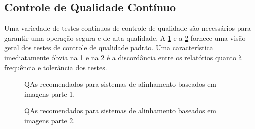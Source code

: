 \documentclass[11pt,a4paper]{article}
\begin{document}
\subsection*{Controle de Qualidade Contínuo}

    Uma variedade de testes contínuos de controle de qualidade são necessários para garantir uma operação segura e de alta qualidade. A \ref{fig:qaImagensParte1} e a \ref{fig:qaImagensParte2} fornece uma visão geral dos testes de controle de qualidade padrão. Uma característica imediatamente óbvia na \ref{fig:qaImagensParte1} e na \ref{fig:qaImagensParte2} é a discordância entre os relatórios quanto à frequência e tolerância dos testes.

    \begin{figure}[!h]
        \centering
        \caption{QAs recomendados para sistemas de alinhamento baseados em imagens parte 1.}
        \label{fig:qaImagensParte1}
    \end{figure}

    \begin{figure}[!h]
        \centering
        \caption{QAs recomendados para sistemas de alinhamento baseados em imagens parte 2.}
        \label{fig:qaImagensParte2}
    \end{figure}
\end{document}
